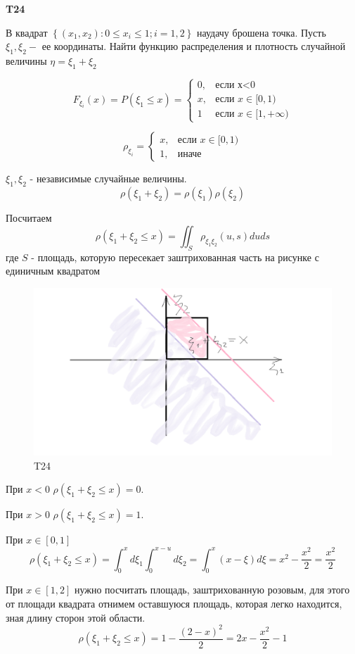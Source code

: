\documentclass[a4paper,12pt]{article} %
\begin{document}
\begin{example}\textbf{T24}

В квадрат $\left\{\left(x_{1}, x_{2}\right): 0 \leqslant x_{i} \leqslant 1 ; i=1,2\right\}$ наудачу брошена точка. 
Пусть $\xi_{1}, \xi_{2}-$ ее координаты. 
Найти функцию распределения и плотность случайной величины $\eta=\xi_{1}+\xi_{2}$


\[ F_{\xi_i}(x)=P(\xi_1 \le x) = 
\begin{cases} 
	0, & \text{если х<0} \\ 
	x, &\text{если }  x\in[0,1) \\
	 1 &\text{если }  x\in[1,+\infty)   
\end{cases}  \]


\[ \rho_{\xi_i}= 
\begin{cases} 
	x, &\text{если }  x\in[0,1) \\
	1, &\text{иначе } 
\end{cases}  \]


$ \xi_1,\xi_2$ - независимые случайные величины.
\[ \rho(\xi_1+\xi_2)= \rho(\xi_1) \rho(\xi_2)\]

Посчитаем 
\[ \rho(\xi_1+\xi_2\le x) =\iint_S \rho_{\xi_1 \xi_2} (u,s) du ds \]
где $S$ - площадь, которую пересекает заштрихованная часть на рисунке с единичным квадратом

\begin{figure}[h!]
	\centering
	\includegraphics[width=0.7\linewidth]{t24}
	\caption{T24}
	\label{fig:t24}
\end{figure}

При $x<0$  $ \rho(\xi_1+\xi_2\le x)=0$.

При $x>0$  $ \rho(\xi_1+\xi_2\le x)=1$.

При $ x\in [0,1] $
\[ \rho(\xi_1+\xi_2\le x) =\int_0^x d\xi_1 \int_0^{x-u} d\xi_2= \int_0^x (x-\xi) d\xi= x^2-\frac{x^2}{2}=\frac{x^2}{2} \]

При $ x\in [1,2] $ нужно посчитать площадь, заштрихованную розовым, для этого от площади квадрата отнимем 
оставшуюся площадь, которая легко находится, зная длину сторон этой области.
\[ \rho(\xi_1+\xi_2\le x) =1-\frac{(2-x)^2}{2}=2x-\frac{x^2}{2}-1
\]


\end{example}
\end{document}
